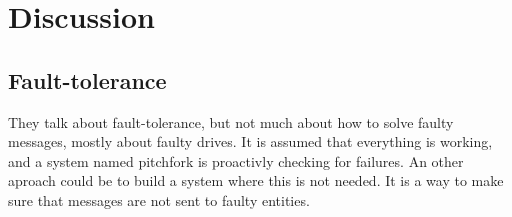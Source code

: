 \section{Discussion}
\subsection{Fault-tolerance}
They talk about fault-tolerance, but not much about how to solve faulty messages, mostly
about faulty drives. It is assumed that everything is working, and a system named pitchfork
is proactivly checking for failures. An other aproach could be to build a system where this
is not needed. It is a way to make sure that messages are not sent to faulty entities. 

